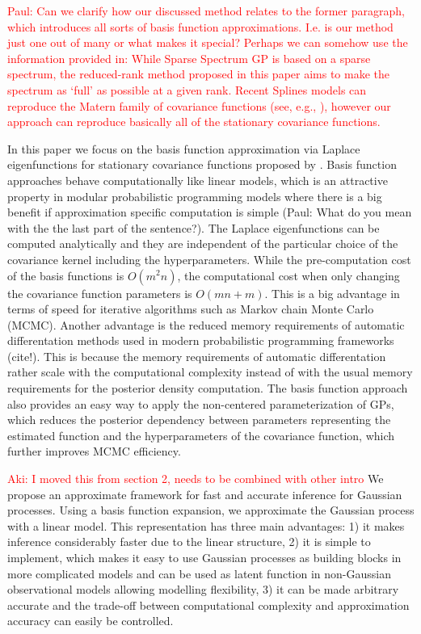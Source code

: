 \documentclass[]{interact}
\theoremstyle{plain}%
\theoremstyle{definition}
\theoremstyle{remark}
\begin{document}
\textcolor{red}{Paul: Can we clarify how our discussed method relates to the former paragraph,
which introduces all sorts of basis function approximations. I.e. is our method
just one out of many or what makes it special? Perhaps we can somehow use the information provided
in: While Sparse Spectrum GP is based on a sparse spectrum, the reduced-rank method proposed in this paper aims to make the spectrum as ‘full’ as possible at a given rank. Recent Splines models can reproduce the Matern family of covariance functions (see, e.g., \cite{wood2003thin}), however our approach can reproduce basically all of the stationary covariance functions.}

In this paper we focus on the basis function approximation via Laplace eigenfunctions for stationary covariance functions proposed by \citet{solin2018hilbert}. Basis function approaches behave computationally like linear models, which is an attractive property in modular probabilistic programming models where there is a big benefit if approximation specific computation is simple (Paul: What do you mean with the the last part of the sentence?). The Laplace eigenfunctions can be computed analytically and they are independent of the particular choice of the covariance kernel including the hyperparameters. While the pre-computation cost of the basis functions is $O(m^2n)$, the computational cost when only changing the covariance function parameters is $O(mn+m)$.%
This is a big advantage in terms of speed for iterative algorithms such as Markov chain Monte Carlo (MCMC). Another advantage is the reduced memory requirements of automatic differentation methods used in modern probabilistic programming frameworks (cite!). This is because the memory requirements of automatic differentation rather scale with the computational complexity instead of with the usual memory requirements for the posterior density computation. The basis function approach also provides an easy way to apply the non-centered parameterization of GPs, which reduces the posterior dependency between parameters representing the estimated function and the hyperparameters of the covariance function, which further improves MCMC efficiency.

\textcolor{red}{Aki: I moved this from section 2, needs to be combined with other intro}
We propose an approximate framework for fast and accurate inference
for Gaussian processes. Using a basis function expansion, we
approximate the Gaussian process with a linear model. This
representation has three main advantages: 1) it makes inference
considerably faster due to the linear structure, 2) it is simple to
implement, which makes it easy to use Gaussian processes as building
blocks in more complicated models and can be used as latent function
in non-Gaussian observational models allowing modelling flexibility,
3) it can be made arbitrary accurate and the trade-off between
computational complexity and approximation accuracy can easily be
controlled.
\end{document}
